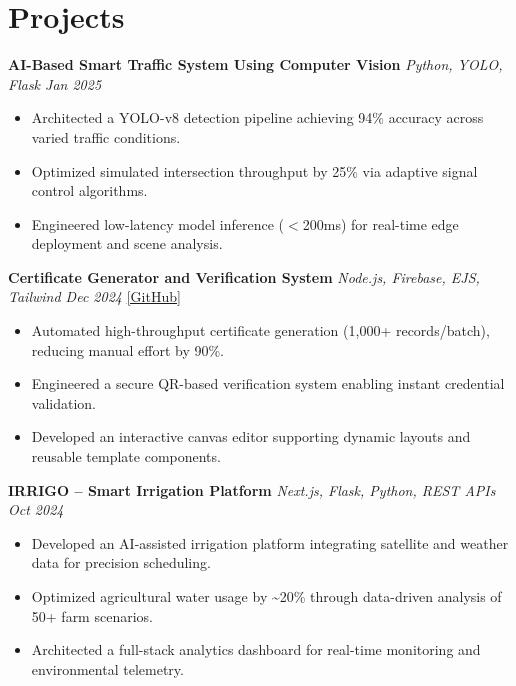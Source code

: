 \documentclass[a4paper,10pt]{article}
\begin{document}
\section*{Projects}

\textbf{AI-Based Smart Traffic System Using Computer Vision} \hfill \textit{Python, YOLO, Flask \quad Jan 2025}
\begin{itemize}
\item Architected a YOLO-v8 detection pipeline achieving 94\% accuracy across varied traffic conditions.
\item Optimized simulated intersection throughput by 25\% via adaptive signal control algorithms.
\item Engineered low-latency model inference ($<$200ms) for real-time edge deployment and scene analysis.
\end{itemize}

\vspace{4pt}

\textbf{Certificate Generator and Verification System} \hfill \textit{Node.js, Firebase, EJS, Tailwind \quad Dec 2024} \quad \href{https://github.com/your-github/advanced-certificate-generator}{[GitHub]}
\begin{itemize}
\item Automated high-throughput certificate generation (1,000+ records/batch), reducing manual effort by 90\%.
\item Engineered a secure QR-based verification system enabling instant credential validation.
\item Developed an interactive canvas editor supporting dynamic layouts and reusable template components.
\end{itemize}

\vspace{4pt}

\textbf{IRRIGO -- Smart Irrigation Platform} \hfill \textit{Next.js, Flask, Python, REST APIs \quad Oct 2024}
\begin{itemize}
\item Developed an AI-assisted irrigation platform integrating satellite and weather data for precision scheduling.
\item Optimized agricultural water usage by \textasciitilde20\% through data-driven analysis of 50+ farm scenarios.
\item Architected a full-stack analytics dashboard for real-time monitoring and environmental telemetry.
\end{itemize}
\end{document}
